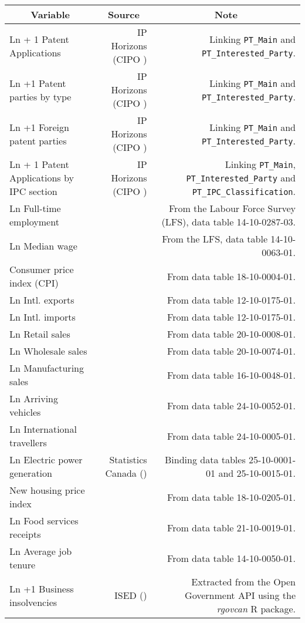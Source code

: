 \begin{tabular}[t]{lrr}
  \toprule
  \multicolumn{1}{c}{Variable} & \multicolumn{1}{c}{Source} & \multicolumn{1}{c}{Note} \\
  \midrule
  Ln + 1 Patent Applications & IP Horizons (CIPO \citeyear{canadianintellectualpropertyoffice23}) & Linking \texttt{PT\_Main} and \texttt{PT\_Interested\_Party}. \\
  Ln +1 Patent parties by type & IP Horizons (CIPO \citeyear{canadianintellectualpropertyoffice23}) & Linking \texttt{PT\_Main} and \texttt{PT\_Interested\_Party}. \\
  Ln +1 Foreign patent parties & IP Horizons (CIPO \citeyear{canadianintellectualpropertyoffice23}) & Linking \texttt{PT\_Main} and \texttt{PT\_Interested\_Party}. \\
  Ln + 1 Patent Applications by IPC section & IP Horizons (CIPO \citeyear{canadianintellectualpropertyoffice23}) & Linking \texttt{PT\_Main}, \texttt{PT\_Interested\_Party} and \texttt{PT\_IPC\_Classification}. \\
  Ln Full-time employment & \textcite{lfs_lfc_table} &  From the Labour Force Survey (LFS), data table 14-10-0287-03.\\
  Ln Median wage & \textcite{lfs_employee_wages} & From the LFS, data table 14-10-0063-01.\\
  Consumer price index (CPI) & \textcite{cpi}  & From data table 18-10-0004-01.\\
  Ln Intl. exports  & \textcite{statisticscanada24g} & From data table 12-10-0175-01. \\
  Ln Intl. imports & \textcite{statisticscanada24g} & From data table 12-10-0175-01. \\
  Ln Retail sales & \textcite{retail_trade_sales}& From data table 20-10-0008-01.\\
  Ln Wholesale sales & \textcite{wholesale_trade} & From data table 20-10-0074-01.\\
  Ln Manufacturing sales & \textcite{manufacturing_sales} & From data table 16-10-0048-01. \\
  Ln Arriving vehicles & \textcite{statisticscanada24d} & From data table 24-10-0052-01.\\
  Ln International travellers & \textcite{statisticscanada24e} & From data table 24-10-0005-01.\\
  Ln Electric power generation & Statistics Canada (\citeyear{statisticscanada08, statisticscanada24f}) & Binding data tables 25-10-0001-01 and 25-10-0015-01.\\
  New housing price index & \textcite{statisticscanada24a} & From data table 18-10-0205-01. \\
  Ln Food services receipts & \textcite{statisticscanada24c} & From data table 21-10-0019-01. \\
  Ln Average job tenure & \textcite{statisticscanada24b} & From data table 14-10-0050-01. \\
  Ln +1 Business insolvencies & ISED (\citeyear{insolvency24}) & Extracted from the Open Government API using the \textit{rgovcan} R package. \\
  \bottomrule
\end{tabular}
